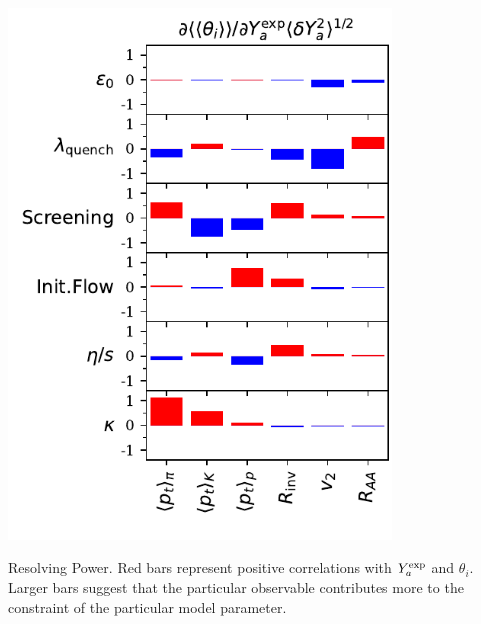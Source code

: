 \documentclass[UserManual.tex]{subfiles}
\begin{document}
\parbox{4.0in}{\centerline{\includegraphics[width=4.0in]{RP_rhic.pdf}}}
\parbox{2.5in}{Resolving Power. Red bars represent positive correlations with $Y^{\rm exp}_a$ and $\theta_i$. Larger bars suggest that the particular observable contributes more to the constraint of the particular model parameter.}
\end{document}

